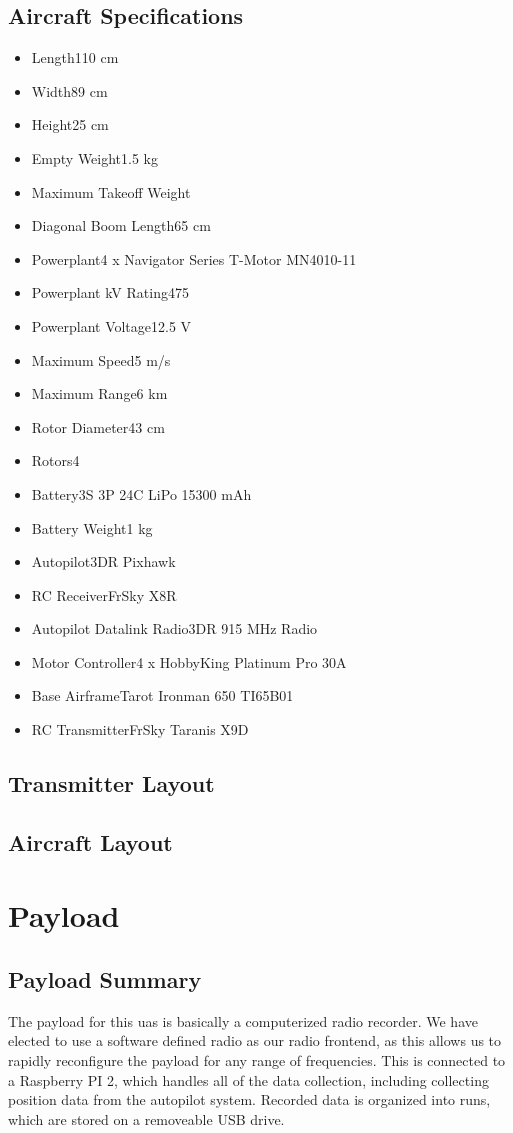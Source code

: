 \documentclass{report}
\begin{document}
		\subsection{Aircraft Specifications}
			\begin{itemize}
				\item Length\hfill110 cm
				\item Width\hfill89 cm
				\item Height\hfill25 cm
				\item Empty Weight\hfill1.5 kg
				\item Maximum Takeoff Weight\hfill
				\item Diagonal Boom Length\hfill65 cm
				\item Powerplant\hfill 4 x Navigator Series T-Motor MN4010-11
				\item Powerplant kV Rating\hfill475
				\item Powerplant Voltage\hfill12.5 V
				\item Maximum Speed\hfill 5 m/s
				\item Maximum Range\hfill 6 km
				\item Rotor Diameter\hfill 43 cm
				\item Rotors\hfill4
				\item Battery\hfill 3S 3P 24C \gls{LiPo} 15300 mAh
				\item Battery Weight\hfill 1 kg
				\item Autopilot\hfill3DR Pixhawk
				\item RC Receiver\hfill FrSky X8R
				\item Autopilot Datalink Radio\hfill 3DR 915 MHz Radio
				\item Motor Controller\hfill 4 x HobbyKing Platinum Pro 30A
				\item Base Airframe\hfill Tarot Ironman 650 TI65B01
				\item RC Transmitter\hfill FrSky Taranis X9D
			\end{itemize}
		\subsection{Transmitter Layout}
		\subsection{Aircraft Layout}
	\section{Payload}
		\subsection{Payload Summary}
			The payload for this \gls{uas} is basically a computerized radio recorder.  We have elected to use a software defined radio as our radio frontend, as this allows us to rapidly reconfigure the payload for any range of frequencies.  This is connected to a Raspberry PI 2, which handles all of the data collection, including collecting position data from the autopilot system.  Recorded data is organized into runs, which are stored on a removeable USB drive.
\end{document}
